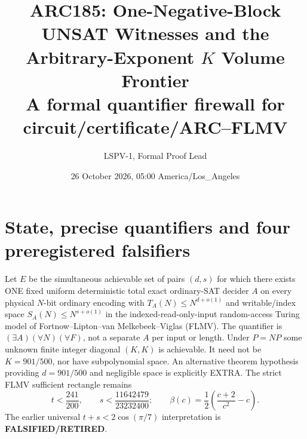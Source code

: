 \documentclass[11pt]{article}
\title{ARC185: One-Negative-Block UNSAT Witnesses and the Arbitrary-Exponent $K$ Volume Frontier\\\large A formal quantifier firewall for circuit/certificate/ARC--FLMV}
\author{LSPV-1, Formal Proof Lead}
\date{26 October 2026, 05:00 America/Los\_Angeles}
\begin{document}
\maketitle
\begin{center}
\end{center}

\section{State, precise quantifiers and four preregistered falsifiers}
Let $E$ be the simultaneous achievable set of pairs $(d,s)$ for which there exists ONE fixed uniform deterministic total exact ordinary-SAT decider $A$ on every physical $N$-bit ordinary encoding with $T_A(N)\le N^{d+o(1)}$ and writable/index space $S_A(N)\le N^{s+o(1)}$ in the indexed-read-only-input random-access Turing model of Fortnow--Lipton--van Melkebeek--Viglas (FLMV). The quantifier is $(\exists A)(\forall N)(\forall F)$, not a separate $A$ per input or length. Under $P=NP$ some unknown finite integer diagonal $(K,K)$ is achievable. It need not be $K=901/500$, nor have subpolynomial space. An alternative theorem hypothesis providing $d=901/500$ and negligible space is explicitly EXTRA. The strict FLMV sufficient rectangle remains
\[
t<\frac{241}{200},\qquad s<\frac{11642479}{23232400};\qquad
\beta(c)=\frac12\left(\frac{c+2}{c^2}-c\right).
\]
The earlier universal $t+s<2\cos(\pi/7)$ interpretation is \textbf{FALSIFIED/RETIRED}.
\end{document}
